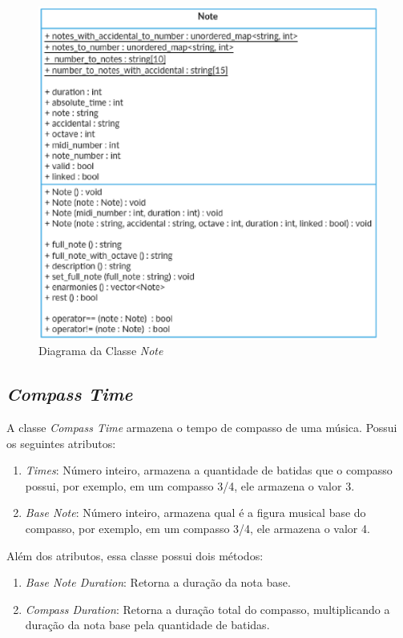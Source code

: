       \begin{figure}[htb]
        \centering
        \includegraphics[scale=0.7]{figuras/noteclass.eps}
        \caption{Diagrama da Classe \textit{Note}}
        \label{noteclass}
      \end{figure}

    \subsection[\textit{Compass Time}]{\textit{Compass Time}}

      A classe \textit{Compass Time} armazena o tempo de compasso de uma música. Possui os seguintes atributos:

      \begin{enumerate}
        \item \textit{Times}: Número inteiro, armazena a quantidade de batidas que o compasso possui, por exemplo, em um compasso 3/4, ele armazena o valor 3.
        \item \textit{Base Note}: Número inteiro, armazena qual é a figura musical base do compasso, por exemplo, em um compasso 3/4, ele armazena o valor 4.
      \end{enumerate}

      Além dos atributos, essa classe possui dois métodos:

      \begin{enumerate}
        \item \textit{Base Note Duration}: Retorna a duração da nota base.
        \item \textit{Compass Duration}: Retorna a duração total do compasso, multiplicando a duração da nota base pela quantidade de batidas.
      \end{enumerate}


